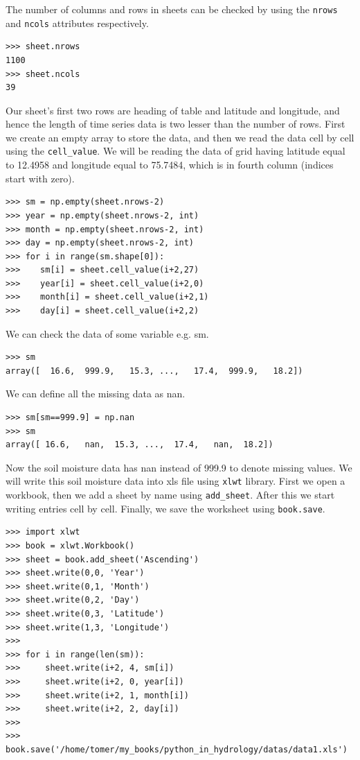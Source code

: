 \documentclass[10pt]{book}
\begin{document}
The number of columns and rows in sheets can be checked by using the \verb"nrows" and \verb"ncols" attributes respectively. 
\beforeverb \begin{verbatim}
>>> sheet.nrows
1100
>>> sheet.ncols
39
\end{verbatim} \afterverb
Our sheet's first two rows are heading of table and latitude and longitude, and hence the length of time series data is two lesser than the number of rows. First we create an empty array to store the data, and then we read the data cell by cell using the \verb"cell_value". We will be reading the data of grid having latitude equal to 12.4958 and longitude equal to 75.7484, which is in fourth column (indices start with zero). 
\beforeverb \begin{verbatim}
>>> sm = np.empty(sheet.nrows-2)
>>> year = np.empty(sheet.nrows-2, int)
>>> month = np.empty(sheet.nrows-2, int)
>>> day = np.empty(sheet.nrows-2, int)
>>> for i in range(sm.shape[0]): 
>>>    sm[i] = sheet.cell_value(i+2,27)  
>>>    year[i] = sheet.cell_value(i+2,0)
>>>    month[i] = sheet.cell_value(i+2,1)
>>>    day[i] = sheet.cell_value(i+2,2)
\end{verbatim} \afterverb
We can check the data of some variable e.g. sm.
\beforeverb \begin{verbatim}
>>> sm
array([  16.6,  999.9,   15.3, ...,   17.4,  999.9,   18.2])
\end{verbatim} \afterverb
We can define all the missing data as nan. 
\beforeverb \begin{verbatim}
>>> sm[sm==999.9] = np.nan
>>> sm
array([ 16.6,   nan,  15.3, ...,  17.4,   nan,  18.2])
\end{verbatim} \afterverb
Now the soil moisture data has nan instead of 999.9 to denote missing values. We will write this soil moisture data into xls file using \verb"xlwt" library. First we open a workbook, then we add a sheet by name using \verb"add_sheet". After this we start writing entries cell by cell. Finally, we save the worksheet using \verb"book.save". 

\beforeverb \begin{verbatim}
>>> import xlwt
>>> book = xlwt.Workbook()
>>> sheet = book.add_sheet('Ascending')
>>> sheet.write(0,0, 'Year')
>>> sheet.write(0,1, 'Month')
>>> sheet.write(0,2, 'Day')
>>> sheet.write(0,3, 'Latitude')
>>> sheet.write(1,3, 'Longitude')
>>> 
>>> for i in range(len(sm)):
>>>     sheet.write(i+2, 4, sm[i])
>>>     sheet.write(i+2, 0, year[i])
>>>     sheet.write(i+2, 1, month[i])
>>>     sheet.write(i+2, 2, day[i])
>>>     
>>> book.save('/home/tomer/my_books/python_in_hydrology/datas/data1.xls')
\end{verbatim} \afterverb
\end{document}
